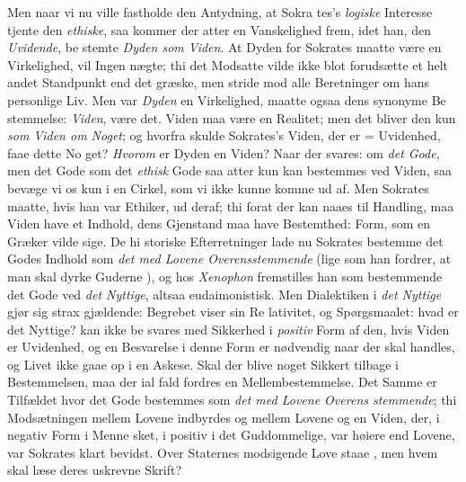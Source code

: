Men naar vi nu ville fastholde den Antydning, at Sokra\-%
tes's \emph{logiske} Interesse tjente den \emph{ethiske}, saa kommer der
atter en Vanskelighed frem, idet han, den \emph{Uvidende}, be\-%
stemte \emph{Dyden som Viden}. At Dyden for Sokrates maatte
være en Virkelighed, vil Ingen nægte; thi det Modsatte vilde
ikke blot forudsætte et helt andet Standpunkt end det græske,
men stride mod alle Beretninger om hans personlige Liv. Men
var \emph{Dyden} en Virkelighed, maatte ogsaa dens synonyme Be\-%
stemmelse: \emph{Viden}, være det. Viden maa være en Realitet;
men det bliver den kun \emph{som Viden om Noget}; og hvorfra
skulde Sokrates's Viden, der er = Uvidenhed, faae dette No\-%
get? \emph{Hvorom} er Dyden en Viden? Naar der svares: om
\emph{det Gode}, men det Gode som det \emph{ethisk} Gode saa atter
kun kan bestemmes ved Viden, saa bevæge vi os kun i en
Cirkel, som vi ikke kunne komme ud af. Men Sokrates maatte,
hvis han var Ethiker, ud deraf; thi forat der kan naaes til
Handling, maa Viden have et Indhold, dens Gjenstand maa
have Bestemthed: Form, som en Græker vilde sige. De hi\-%
storiske Efterretninger lade nu Sokrates bestemme det Godes
Indhold som \emph{det med Lovene Overensstemmende} (lige\-%
som han fordrer, at man skal dyrke Guderne ),
og hos \emph{Xenophon} fremstilles han som bestemmende det Gode
ved \emph{det Nyttige}, altsaa eudaimonistisk. Men Dialektiken i
\emph{det Nyttige} gjør sig strax gjældende: Begrebet viser sin Re\-%
lativitet, og Spørgsmaalet: hvad er det Nyttige? kan ikke be\-%
svares med Sikkerhed i \emph{positiv} Form af den, hvis Viden er
Uvidenhed, og en Besvarelse i denne Form er nødvendig naar
der skal handles, og Livet ikke gaae op i en Askese. Skal
der blive noget Sikkert tilbage i Bestemmelsen, maa der ial\-%
fald fordres en Mellembestemmelse. Det Samme er Tilfældet
hvor det Gode bestemmes som \emph{det med Lovene Overens\-%
stemmende}; thi Modsætningen mellem Lovene indbyrdes og
mellem Lovene og en Viden, der, i negativ Form i Menne\-%
sket, i positiv i det Guddommelige, var høiere end Lovene,
var Sokrates klart bevidst. Over Staternes modsigende Love
staae , men hvem skal læse deres uskrevne
Skrift?

